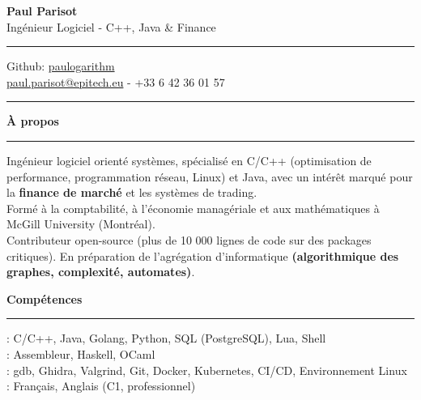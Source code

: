 \documentclass[9pt]{extarticle}
\begin{document}
\begin{center}
	{\huge\bfseries Paul Parisot}
	\\[4pt]
	{\Large Ingénieur Logiciel - C++, Java \& Finance}
	\\
\end{center}

\par\vspace{-5pt}
\rule{\linewidth}{0.4pt}
\par\vspace{-5pt}

\begin{center}
	Github: \href{https://github.com/paulogarithm}{paulogarithm}
	\\
	\href{mailto:paul.parisot@epitech.eu}{paul.parisot@epitech.eu} - +33 6 42 36 01 57
	\\
\end{center}

\par\vspace{-10pt}
\rule{\linewidth}{0.4pt}
\par\vspace{7pt}

{\large\bfseries À propos}
\par\vspace{-8pt}
\rule{\linewidth}{0.4pt}
\par\vspace{5pt}

Ingénieur logiciel orienté systèmes, spécialisé en C/C++ (optimisation de performance, programmation réseau, Linux) et Java, avec un intérêt marqué pour la {\bfseries finance de marché} et les systèmes de trading.
\\
Formé à la comptabilité, à l'économie managériale et aux mathématiques à McGill University (Montréal).
\\
Contributeur open-source (plus de 10 000 lignes de code sur des packages critiques). En préparation de l'agrégation d'informatique {\bfseries (algorithmique des graphes, complexité, automates)}.
\par\vspace{5pt}

{\large\bfseries Compétences}
\par\vspace{-8pt}
\rule{\linewidth}{0.4pt}
\par\vspace{5pt}

\hspace*{5pt}{\bfseries Maîtrise}: C/C++, Java, Golang, Python, SQL (PostgreSQL), Lua, Shell
\\
\hspace*{5pt}{\bfseries Bonne connaissance}: Assembleur, Haskell, OCaml
\\
\hspace*{5pt}{\bfseries Outils}: gdb, Ghidra, Valgrind, Git, Docker, Kubernetes, CI/CD, Environnement Linux
\\
\hspace*{5pt}{\bfseries Langues}: Français, Anglais (C1, professionnel)
\end{document}
